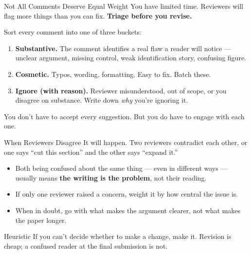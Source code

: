 \begin{frame}{Not All Comments Deserve Equal Weight}
  You have limited time. Reviewers will flag more things than you can fix. \textbf{\textcolor{usfgreen}{Triage before you revise.}}

  \vspace{8pt}

  Sort every comment into one of three buckets:

  \vspace{6pt}

  \begin{enumerate}\setlength\itemsep{2pt}
    \item \textbf{Substantive.} The comment identifies a real flaw a reader will notice --- unclear argument, missing control, weak identification story, confusing figure.
    \item \textbf{Cosmetic.} Typos, wording, formatting. Easy to fix. Batch these.
    \item \textbf{Ignore (with reason).} Reviewer misunderstood, out of scope, or you disagree on substance. Write down \textit{why} you're ignoring it.
  \end{enumerate}

  \vspace{8pt}

  You don't have to accept every suggestion. But you do have to engage with each one.
\end{frame}

\begin{frame}{When Reviewers Disagree}
  It will happen. Two reviewers contradict each other, or one says ``cut this section'' and the other says ``expand it.''

  \vspace{8pt}

  \begin{itemize}\setlength\itemsep{2pt}
    \item Both being confused about the same thing --- even in different ways --- usually means \textbf{the writing is the problem}, not their reading.
    \item If only one reviewer raised a concern, weight it by how central the issue is.
    \item When in doubt, go with what makes the argument clearer, not what makes the paper longer.
  \end{itemize}

  \vspace{8pt}

  \begin{block}{Heuristic}
    If you can't decide whether to make a change, make it. Revision is cheap; a confused reader at the final submission is not.
  \end{block}
\end{frame}

